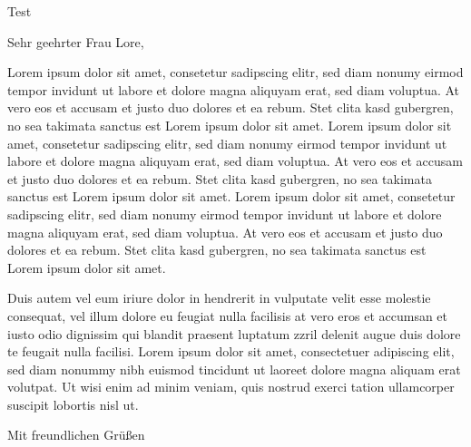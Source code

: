 \documentclass[%
fontsize=12pt,%
paper=a4,%
DIV=14,%
BCOR=5mm,%
pagenumber=footcenter,%
parskip=half*,%
naustrian%
]{scrlttr2}%
\begin{document}
	\begin{letter}{Test}
		
		
		
		\opening{Sehr geehrter Frau Lore,}
		
		Lorem ipsum dolor sit amet, consetetur sadipscing elitr, sed diam nonumy eirmod tempor invidunt ut labore et dolore magna aliquyam erat, sed diam voluptua. At vero eos et accusam et justo duo dolores et ea rebum. Stet clita kasd gubergren, no sea takimata sanctus est Lorem ipsum dolor sit amet. Lorem ipsum dolor sit amet, consetetur sadipscing elitr, sed diam nonumy eirmod tempor invidunt ut labore et dolore magna aliquyam erat, sed diam voluptua. At vero eos et accusam et justo duo dolores et ea rebum. Stet clita kasd gubergren, no sea takimata sanctus est Lorem ipsum dolor sit amet. Lorem ipsum dolor sit amet, consetetur sadipscing elitr, sed diam nonumy eirmod tempor invidunt ut labore et dolore magna aliquyam erat, sed diam voluptua. At vero eos et accusam et justo duo dolores et ea rebum. Stet clita kasd gubergren, no sea takimata sanctus est Lorem ipsum dolor sit amet.   
		
		Duis autem vel eum iriure dolor in hendrerit in vulputate velit esse molestie consequat, vel illum dolore eu feugiat nulla facilisis at vero eros et accumsan et iusto odio dignissim qui blandit praesent luptatum zzril delenit augue duis dolore te feugait nulla facilisi. Lorem ipsum dolor sit amet, consectetuer adipiscing elit, sed diam nonummy nibh euismod tincidunt ut laoreet dolore magna aliquam erat volutpat.   
		Ut wisi enim ad minim veniam, quis nostrud exerci tation ullamcorper suscipit lobortis nisl ut.
		
		\closing{Mit freundlichen Grüßen}
		
	\end{letter}
\end{document}

